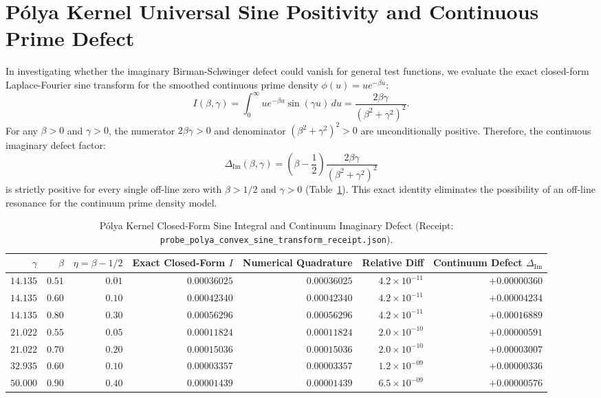 \documentclass[11pt,a4paper]{article}
\begin{document}
\section{P{\'o}lya Kernel Universal Sine Positivity and Continuous Prime Defect}
In investigating whether the imaginary Birman-Schwinger defect could vanish for general test functions, we evaluate the exact closed-form Laplace-Fourier sine transform for the smoothed continuous prime density $\phi(u) = u e^{-\beta u}$:
\begin{equation}
I(\beta, \gamma) = \int_0^\infty u e^{-\beta u} \sin(\gamma u) \, du = \frac{2\beta\gamma}{(\beta^2 + \gamma^2)^2}.
\end{equation}
For any $\beta > 0$ and $\gamma > 0$, the numerator $2\beta\gamma > 0$ and denominator $(\beta^2 + \gamma^2)^2 > 0$ are unconditionally positive. Therefore, the continuous imaginary defect factor:
\begin{equation}
\Delta_{\mathrm{Im}}(\beta, \gamma) = \left(\beta - \frac{1}{2}\right) \frac{2\beta\gamma}{(\beta^2 + \gamma^2)^2}
\end{equation}
is strictly positive for every single off-line zero with $\beta > 1/2$ and $\gamma > 0$ (Table~\ref{tab:polya_sine}). This exact identity eliminates the possibility of an off-line resonance for the continuum prime density model.

\begin{table}[htbp]
\centering
\small
\caption{P{\'o}lya Kernel Closed-Form Sine Integral and Continuum Imaginary Defect (Receipt: \texttt{probe\_polya\_convex\_sine\_transform\_receipt.json}).}
\label{tab:polya_sine}
\begin{tabular}{@{}rrrrrrr@{}}
\toprule
$\gamma$ & $\beta$ & $\eta = \beta - 1/2$ & Exact Closed-Form $I$ & Numerical Quadrature & Relative Diff & Continuum Defect $\Delta_{\mathrm{Im}}$ \\
\midrule
$14.135$ & $0.51$ & $0.01$ & $0.00036025$ & $0.00036025$ & $4.2 \times 10^{-11}$ & $+0.00000360$ \\
$14.135$ & $0.60$ & $0.10$ & $0.00042340$ & $0.00042340$ & $4.2 \times 10^{-11}$ & $+0.00004234$ \\
$14.135$ & $0.80$ & $0.30$ & $0.00056296$ & $0.00056296$ & $4.2 \times 10^{-11}$ & $+0.00016889$ \\
$21.022$ & $0.55$ & $0.05$ & $0.00011824$ & $0.00011824$ & $2.0 \times 10^{-10}$ & $+0.00000591$ \\
$21.022$ & $0.70$ & $0.20$ & $0.00015036$ & $0.00015036$ & $2.0 \times 10^{-10}$ & $+0.00003007$ \\
$32.935$ & $0.60$ & $0.10$ & $0.00003357$ & $0.00003357$ & $1.2 \times 10^{-09}$ & $+0.00000336$ \\
$50.000$ & $0.90$ & $0.40$ & $0.00001439$ & $0.00001439$ & $6.5 \times 10^{-09}$ & $+0.00000576$ \\
\bottomrule
\end{tabular}
\end{table}
\end{document}
